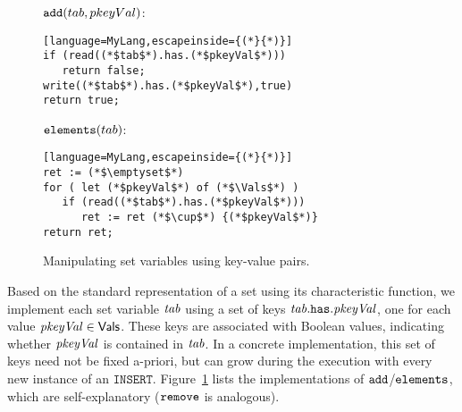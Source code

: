 \begin{figure}[t]
\small
\begin{minipage}[t]{4.2cm}
\begin{flushleft}
$\mathtt{add}(tab,pkeyVal)$:
\end{flushleft}
\vspace{-2mm}
\begin{lstlisting}[language=MyLang,escapeinside={(*}{*)}] 
if (read((*$tab$*).has.(*$pkeyVal$*))) 
   return false;
write((*$tab$*).has.(*$pkeyVal$*),true)
return true;
\end{lstlisting}
\end{minipage}
%
%
%
\begin{minipage}[t]{4cm}
\begin{flushleft}
$\mathtt{elements}(tab)$:
\end{flushleft}
\vspace{-2mm}
\begin{lstlisting}[language=MyLang,escapeinside={(*}{*)}]
ret := (*$\emptyset$*)
for ( let (*$pkeyVal$*) of (*$\Vals$*) )
   if (read((*$tab$*).has.(*$pkeyVal$*))) 
      ret := ret (*$\cup$*) {(*$pkeyVal$*)}
return ret;
\end{lstlisting}
\end{minipage}
\vspace{-4mm}
    \caption{Manipulating set variables using key-value pairs.}
    \label{fig:ir-key}
\vspace{-3mm}
\end{figure}

Based on the standard representation of a set using its characteristic function, we implement each set variable $\mathit{tab}$ using a set of keys $\mathit{tab}.\mathtt{has}.\mathit{pkeyVal}$, one for each value $\mathit{pkeyVal}\in\mathsf{Vals}$. These keys are associated with Boolean values, indicating whether $\mathit{pkeyVal}$ is contained in $\mathit{tab}$. In a concrete implementation, this set of keys need not be fixed a-priori, but can grow during the execution with every new instance of an $\mathtt{INSERT}$. Figure~\ref{fig:ir-key} lists the implementations of $\mathtt{add}$/$\mathtt{elements}$, which are self-explanatory ($\mathtt{remove}$ is analogous).

